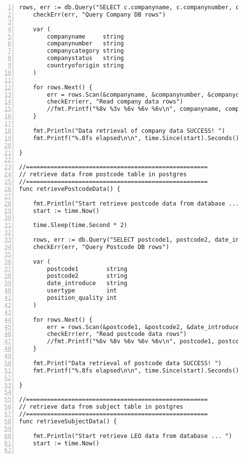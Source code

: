 \begin{lstlisting}[breaklines, frame=single, numbers=left, caption={Golang Sequential Program Source Code}, label=commandline-02]
	rows, err := db.Query("SELECT c.companyname, c.companynumber, c.companycategory, c.companystatus, c.countryoforigin FROM companydata AS c ORDER BY c.companynumber limit 100;")
	checkErr(err, "Query Company DB rows")
	
	var (
		companyname     string
		companynumber   string
		companycategory string
		companystatus   string
		countryoforigin string
	)
	
	for rows.Next() {
		err = rows.Scan(&companyname, &companynumber, &companycategory, &companystatus, &countryoforigin)
		checkErr(err, "Read company data rows")
		//fmt.Printf("%8v %3v %6v %6v %6v\n", companyname, companynumber, companycategory, companystatus, countryoforigin)
	}
	
	fmt.Println("Data retrieval of company data SUCCESS! ")
	fmt.Printf("%.8fs elapsed\n\n", time.Since(start).Seconds())

}

//====================================================
// retrieve data from postcode table in postgres
//====================================================
func retrievePostcodeData() {

	fmt.Println("Start retrieve postcode data from database ... ")
	start := time.Now()
	
	time.Sleep(time.Second * 2)
	
	rows, err := db.Query("SELECT postcode1, postcode2, date_introduce, usertype, position_quality FROM go_nspl LIMIT 50")
	checkErr(err, "Query Postcode DB rows")
	
	var (
		postcode1        string
		postcode2        string
		date_introduce   string
		usertype         int
		position_quality int
	)
	
	for rows.Next() {
		err = rows.Scan(&postcode1, &postcode2, &date_introduce, &usertype, &position_quality)
		checkErr(err, "Read postcode data rows")
		//fmt.Printf("%6v %8v %6v %6v %6v\n", postcode1, postcode2, date_introduce, usertype, position_quality)
	}
	
	fmt.Print("Data retrieval of postcode data SUCCESS! ")
	fmt.Printf("%.8fs elapsed\n\n", time.Since(start).Seconds())

}

//====================================================
// retrieve data from subject table in postgres
//====================================================
func retrieveSubjectData() {

	fmt.Println("Start retrieve LEO data from database ... ")
	start := time.Now()
	

\end{lstlisting}
